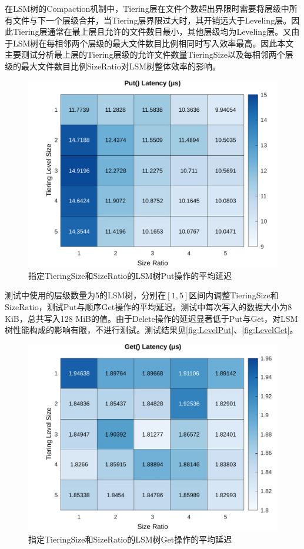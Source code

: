 \documentclass[a4paper,UTF8]{ctexart}
\begin{document}
在LSM树的Compaction机制中，Tiering层在文件个数超出界限时需要将层级中所有文件与下一个层级合并，当Tiering层界限过大时，其开销远大于Leveling层。因此Tiering层通常在最上层且允许的文件数目最小，其他层级均为Leveling层。又由于LSM树在每相邻两个层级的最大文件数目比例相同时写入效率最高\cite{o1996log}。因此本文主要测试分析最上层的Tiering层级的允许文件数量TieringSize以及每相邻两个层级的最大文件数目比例SizeRatio对LSM树整体效率的影响。
\begin{figure}[htbp]
	\centering
	\includegraphics[width=.6\textwidth]{level-put.pdf}
	\caption{指定TieringSize和SizeRatio的LSM树Put操作的平均延迟}
	\label{fig:LevelPut}
\end{figure}
\par
测试中使用的层级数量为5的LSM树，分别在$[1, 5]$区间内调整TieringSize和SizeRatio，测试Put与顺序Get操作的平均延迟。测试中每次写入的数据大小为8 KiB，总共写入128 MiB的值。由于Delete操作的延迟显著低于Put与Get，对LSM树性能构成的影响有限，不进行测试。测试结果见\autoref{fig:LevelPut}、\autoref{fig:LevelGet}。
\begin{figure}[htbp]
	\centering
	\includegraphics[width=.6\textwidth]{level-get.pdf}
	\caption{指定TieringSize和SizeRatio的LSM树Get操作的平均延迟}
	\label{fig:LevelGet}
\end{figure}
\end{document}
